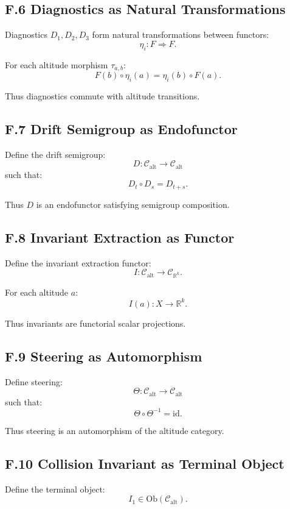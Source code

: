 \subsection*{F.6 Diagnostics as Natural Transformations}

Diagnostics $D_1, D_2, D_3$ form natural transformations between functors:
\[
\eta_i : F \Rightarrow F.
\]

For each altitude morphism $\tau_{a,b}$:
\[
F(b) \circ \eta_i(a) = \eta_i(b) \circ F(a).
\]

Thus diagnostics commute with altitude transitions.

\subsection*{F.7 Drift Semigroup as Endofunctor}

Define the drift semigroup:
\[
D : \mathcal{C}_{\mathrm{alt}} \to \mathcal{C}_{\mathrm{alt}}
\]
such that:
\[
D_t \circ D_s = D_{t+s}.
\]

Thus $D$ is an endofunctor satisfying semigroup composition.

\subsection*{F.8 Invariant Extraction as Functor}

Define the invariant extraction functor:
\[
I : \mathcal{C}_{\mathrm{alt}} \to \mathcal{C}_{\mathbb{R}^k}.
\]

For each altitude $a$:
\[
I(a) : X \to \mathbb{R}^k.
\]

Thus invariants are functorial scalar projections.

\subsection*{F.9 Steering as Automorphism}

Define steering:
\[
\Theta : \mathcal{C}_{\mathrm{alt}} \to \mathcal{C}_{\mathrm{alt}}
\]
such that:
\[
\Theta \circ \Theta^{-1} = \mathrm{id}.
\]

Thus steering is an automorphism of the altitude category.

\subsection*{F.10 Collision Invariant as Terminal Object}

Define the terminal object:
\[
I_1 \in \mathrm{Ob}(\mathcal{C}_{\mathrm{alt}}).
\]

